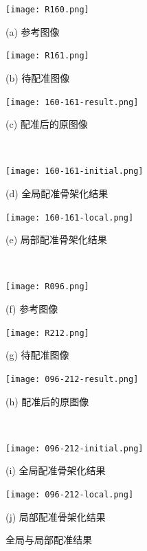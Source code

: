 \begin{figure}[!ht]
\centering

\begin{minipage}[b]{0.3\textwidth} 
      \centering 
      \texttt{[image: R160.png]}
        \centerline{(a) 参考图像}\medskip
\end{minipage}
  \begin{minipage}[b]{0.3\textwidth}
    \centering
    \texttt{[image: R161.png]}
      \centerline{(b) 待配准图像}\medskip
  \end{minipage}
\begin{minipage}[b]{0.3\textwidth}
	\centering
      \texttt{[image: 160-161-result.png]}
        \centerline{(c) 配准后的原图像}\medskip
    \end{minipage}
\\
  \begin{minipage}[b]{0.48\textwidth}
    \centering
    \texttt{[image: 160-161-initial.png]}
      \centerline{(d) 全局配准骨架化结果}\medskip
  \end{minipage}
 \begin{minipage}[b]{0.48\textwidth}
    \centering
      \texttt{[image: 160-161-local.png]}
        \centerline{(e) 局部配准骨架化结果}\medskip
    \end{minipage}
\\
  \begin{minipage}[b]{0.3\textwidth}
    \centering
    \texttt{[image: R096.png]}
      \centerline{(f) 参考图像}\medskip
  \end{minipage}
\begin{minipage}[b]{0.3\textwidth}
      \texttt{[image: R212.png]}
       \centerline{(g) 待配准图像}\medskip
    \end{minipage}
  \begin{minipage}[b]{0.3\textwidth}
    \centering
    \texttt{[image: 096-212-result.png]}
          \centerline{(h) 配准后的原图像}\medskip
  \end{minipage}
\\
 \begin{minipage}[b]{0.48\textwidth}
    \centering
      \texttt{[image: 096-212-initial.png]}
       \centerline{(i) 全局配准骨架化结果}\medskip
    \end{minipage}
  \begin{minipage}[b]{0.48\textwidth}
    \centering
    \texttt{[image: 096-212-local.png]}
           \centerline{(j) 局部配准骨架化结果}\medskip
  \end{minipage}
\caption{全局与局部配准结果}
\label{fig:final-results}
\end{figure}
